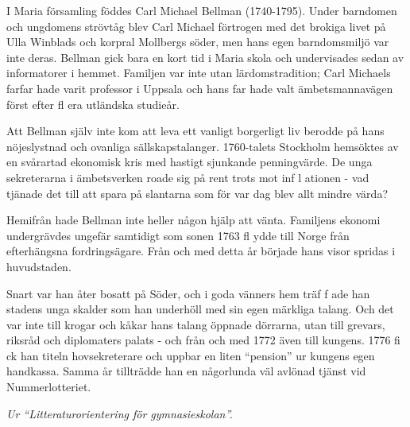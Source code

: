 \vspace{10pt}
{\hspace{15pt} I Maria församling föddes Carl Michael
Bellman (1740-1795).  Under barndomen och ungdomens strövtåg blev Carl
Michael förtrogen med det brokiga livet på Ulla Winblads och korpral
Mollbergs söder, men hans egen barndomsmiljö var inte deras.  Bellman
gick bara en kort tid i Maria skola och undervisades sedan av
informatorer i hemmet. Familjen var inte utan lärdomstradition; Carl
Michaels farfar hade varit professor i Uppsala och hans far hade valt
ämbetsmannavägen först efter fl era utländska studieår.\par
\hspace{15pt} Att Bellman själv inte kom att leva ett vanligt borgerligt liv 
berodde på hans nöjeslystnad och ovanliga sällskapstalanger.
1760-talets Stockholm hemsöktes av en svårartad ekonomisk kris med
hastigt sjunkande penningvärde. De unga sekreterarna i ämbetsverken
roade sig på rent trots mot inf l ationen - vad tjänade det till att
spara på slantarna som för var dag blev allt mindre värda?\par
\hspace{15pt} Hemifrån hade Bellman inte heller någon hjälp att vänta. 
Familjens ekonomi undergrävdes ungefär samtidigt som sonen 1763 fl
ydde till Norge från efterhängsna fordringsägare. Från och med detta
år började hans visor spridas i huvudstaden.\par
\hspace{15pt} Snart var han åter bosatt på Söder, och i goda vänners hem 
träf f ade han stadens unga skalder som han underhöll med sin egen
märkliga talang. Och det var inte till krogar och kåkar hans talang
öppnade dörrarna, utan till grevars, riksråd och diplomaters palats -
och från och med 1772 även till kungens. 1776 fi ck han titeln
hovsekreterare och uppbar en liten ``pension'' ur kungens egen
handkassa. Samma år tillträdde han en någorlunda väl avlönad tjänst
vid Nummerlotteriet.\par}
\vspace{10pt}
{\footnotesize\textit{Ur ``Litteraturorientering för gymnasieskolan''.}}
